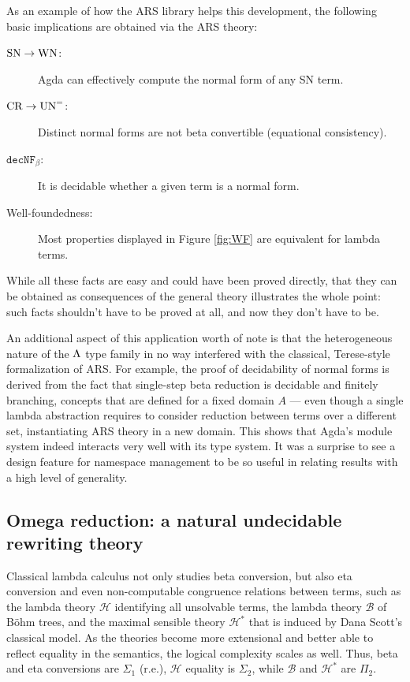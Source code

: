 As an example of how the ARS library helps this development, the following basic implications are obtained via the ARS theory:
\begin{description}
  \item[$\mathrm{SN} \to \mathrm{WN}$:] Agda can effectively compute the normal form of any SN term.
  \item[$\mathrm{CR} \to \mathrm{UN}^{=}$:] Distinct normal forms are not beta convertible (equational consistency).
  \item[$\mathtt{dec NF_\beta}$:] It is decidable whether a given term is a normal form.
  \item[Well-foundedness:] Most properties displayed in Figure \ref{fig:WF} are equivalent for lambda terms.
\end{description}
While all these facts are easy and could have been proved directly, that they can be obtained as consequences of the general theory 
illustrates the whole point: such facts shouldn't have to be proved at all, and now they don't have to be.

An additional aspect of this application worth of note is that the heterogeneous nature of the $\Lambda$ type family in no way interfered with the classical, Terese-style 
formalization of ARS. For example, the proof of decidability of normal forms is derived from the fact that single-step beta reduction is 
decidable and finitely branching, concepts that are defined for a fixed domain $A$ --- even though a single lambda abstraction requires to consider 
reduction between terms over a different set, instantiating ARS theory in a new domain.
This shows that Agda's module system indeed interacts very well with its type system. 
It was a surprise to see a design feature for namespace management to be so useful in relating results with a high level of generality.

\subsection*{Omega reduction: a natural undecidable rewriting theory}
\renewcommand{\mcH}{\mathcal{H}}
\newcommand{\mcB}{\mathcal{B}}

Classical lambda calculus not only studies beta conversion, but also eta conversion and even non-computable congruence relations between terms, such as the lambda theory $\mcH$ identifying all unsolvable terms, the lambda theory $\mcB$ of B\"ohm trees, and the maximal sensible theory $\mcH^*$ that is induced by Dana Scott's classical model. As the theories become more extensional and better able to reflect equality in the semantics, the logical complexity scales as well. Thus, beta and eta conversions are $\Sigma_1$ (r.e.), $\mcH$ equality is $\Sigma_2$, while $\mcB$ and $\mcH^*$ are $\Pi_2$.

